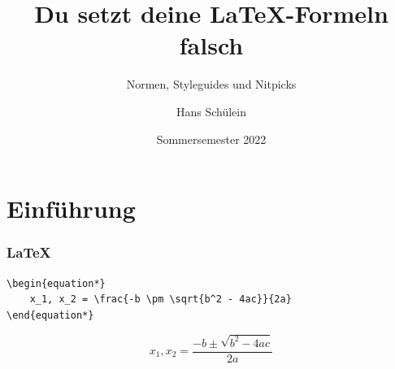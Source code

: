 \documentclass{beamer}
\begin{document}
\title{Du setzt deine \LaTeX-Formeln falsch}
\subtitle{Normen, Styleguides und Nitpicks}
\author{Hans Schülein}
\date{Sommersemester 2022}

\begin{frame}[fragile]
    \titlepage
\end{frame}

\section{Einführung}

\begin{frame}[fragile]
    \frametitle{\LaTeX}
    \begin{lstlisting}
\begin{equation*}
    x_1, x_2 = \frac{-b \pm \sqrt{b^2 - 4ac}}{2a}
\end{equation*}
    \end{lstlisting}

    \begin{equation*}
        x_1, x_2 = \frac{-b \pm \sqrt{b^2 - 4ac}}{2a}
    \end{equation*}
\end{frame}
\end{document}
